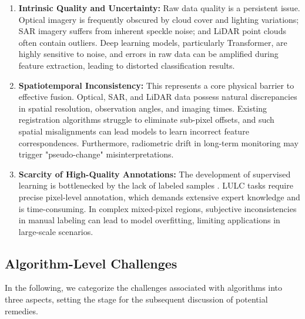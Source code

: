 \documentclass[]{interact}
\theoremstyle{plain}%
\theoremstyle{definition}
\theoremstyle{remark}
\begin{document}
\begin{enumerate}
	\item \textbf{Intrinsic Quality and Uncertainty:} Raw data quality is a persistent issue. Optical imagery is frequently obscured by cloud cover and lighting variations; SAR imagery suffers from inherent speckle noise; and LiDAR point clouds often contain outliers. Deep learning models, particularly Transformer, are highly sensitive to noise, and errors in raw data can be amplified during feature extraction, leading to distorted classification results.
	\item \textbf{Spatiotemporal Inconsistency:} This represents a core physical barrier to effective fusion. Optical, SAR, and LiDAR data possess natural discrepancies in spatial resolution, observation angles, and imaging times. Existing registration algorithms struggle to eliminate sub-pixel offsets, and such spatial misalignments can lead models to learn incorrect feature correspondences. Furthermore, radiometric drift in long-term monitoring may trigger "pseudo-change" misinterpretations.
	\item \textbf{Scarcity of High-Quality Annotations:} The development of supervised learning is bottlenecked by the lack of labeled samples \citep{56}. LULC tasks require precise pixel-level annotation, which demands extensive expert knowledge and is time-consuming. In complex mixed-pixel regions, subjective inconsistencies in manual labeling can lead to model overfitting, limiting applications in large-scale scenarios.
\end{enumerate}





\subsection{Algorithm-Level Challenges}

In the following, we categorize the challenges associated with algorithms into three aspects, setting the stage for the subsequent discussion of potential remedies.
\end{document}
